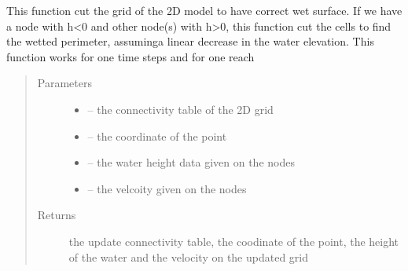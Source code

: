\documentclass[letterpaper,10pt,english]{sphinxmanual}
\begin{document}
\begin{fulllineitems}
\label{\detokenize{index:src.manage_grid_8.cut_2d_grid}}
This function cut the grid of the 2D model to have correct wet surface. If we have a node with h\textless{}0 and other node(s)
with h\textgreater{}0, this function cut the cells to find the wetted perimeter, assuminga linear decrease in the water elevation.
This function works for one time steps and for one reach
\begin{quote}\begin{description}
\item[{Parameters}] \leavevmode\begin{itemize}
\item {} 
 -- the connectivity table of the 2D grid

\item {} 
 -- the coordinate of the point

\item {} 
 -- the water height data given on the nodes

\item {} 
 -- the velcoity given on the nodes

\end{itemize}

\item[{Returns}] \leavevmode
the update connectivity table, the coodinate of the point, the height of the water and the velocity on the updated grid

\end{description}\end{quote}

\end{fulllineitems}

\end{document}
